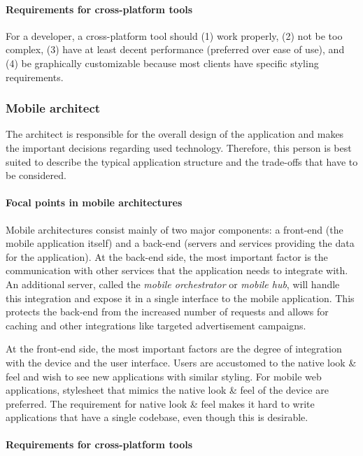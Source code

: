 \paragraph{Requirements for cross-platform tools}

For a developer, a cross-platform tool should (1) work properly, (2) not be too complex, (3) have at least decent performance (preferred over ease of use), and (4) be   graphically customizable because most clients have specific styling requirements.

\subsubsection{Mobile architect}

The architect is responsible for the overall design of the application and makes the important decisions regarding used technology. Therefore, this person is best suited to describe the typical application structure and the trade-offs that have to be considered.

\paragraph{Focal points in mobile architectures} 

Mobile architectures consist mainly of two major components: a front-end (the mobile application itself) and a back-end (servers and services providing the data for the application). At the back-end side, the most important factor is the communication with other services that the application needs to integrate with. An additional server, called the \emph{mobile orchestrator} or \emph{mobile hub}, will handle this integration and expose it in a single interface to the mobile application. This protects the back-end from the increased number of requests and allows for caching and other integrations like targeted advertisement campaigns.

At the front-end side, the most important factors are the degree of integration with the device and the user interface. Users are accustomed to the native look \& feel and wish to see new applications with similar styling. For mobile web applications, stylesheet that mimics the native look \& feel of the device are preferred. The requirement for native look \& feel makes it hard to write applications that have a single codebase, even though this is desirable. 

\paragraph{Requirements for cross-platform tools}


